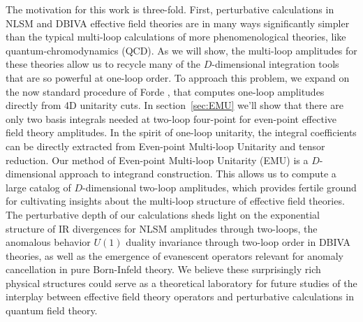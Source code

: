 \documentclass[11pt,letter]{article}
\def\sect#1{section~\ref{#1}}
\begin{document}
The motivation for this work is three-fold. First, perturbative calculations in NLSM and DBIVA effective field theories are in many ways significantly simpler than the typical multi-loop calculations of more phenomenological theories, like quantum-chromodynamics (QCD). As we will show, the multi-loop amplitudes for these theories allow us to recycle many of the $D$-dimensional integration tools that are so powerful at one-loop order. To approach this problem, we expand on the now standard procedure of Forde \cite{Forde:2007mi}, that computes one-loop amplitudes directly from 4D unitarity cuts. In \sect{sec:EMU} we'll show that there are only two basis integrals needed at two-loop four-point for even-point effective field theory amplitudes. In the spirit of one-loop unitarity, the integral coefficients can be directly extracted from Even-point Multi-loop Unitarity and tensor reduction. Our method of Even-point Multi-loop Unitarity (EMU) is a $D$-dimensional approach to integrand construction. This allows us to compute a large catalog of $D$-dimensional two-loop amplitudes, which provides fertile ground for cultivating insights about the multi-loop structure of effective field theories. The perturbative depth of our calculations sheds light on the exponential structure of IR divergences for NLSM amplitudes through two-loops, the anomalous behavior $U(1)$ duality invariance through two-loop order in DBIVA theories, as well as the emergence of evanescent operators relevant for anomaly cancellation in pure Born-Infeld theory. We believe these surprisingly rich physical structures could serve as a theoretical laboratory for future studies of the interplay between effective field theory operators and perturbative calculations in quantum field theory. 
\end{document}
